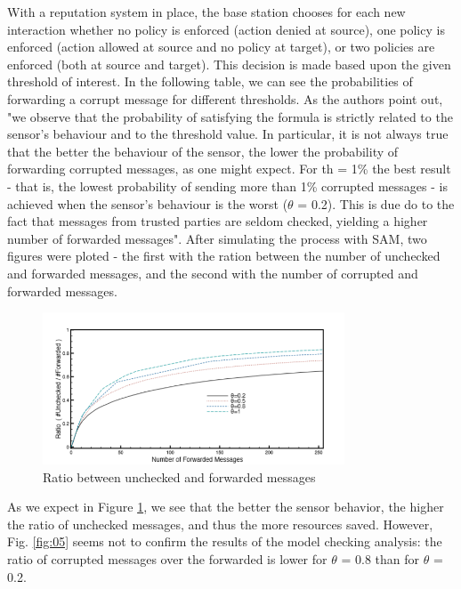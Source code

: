 \documentclass[12pt,a4paper,twoside]{report}
\begin{document}
With a reputation system in place, the base station chooses for each new interaction whether no policy is enforced (action denied at source), one policy is enforced (action allowed at source and no policy at target), or two policies are enforced (both at source and target). This decision is made based upon the given threshold of interest. In the following table, we can see the probabilities of forwarding a corrupt message for different thresholds. As the authors point out, "we observe that the probability of satisfying the formula is strictly related to the sensor's behaviour and to the threshold value. In particular, it is not always true that the better the behaviour of the sensor, the lower the probability of forwarding corrupted messages, as one might expect. For th = 1\% the best result - that is, the lowest probability of sending more than 1\% corrupted messages - is achieved when the sensor's behaviour is the worst ($\theta$ = 0.2). This is due do to the fact that messages from trusted parties are seldom checked, yielding a higher number of forwarded messages". After simulating the process with SAM, two figures were ploted - the first with the ration between the number of unchecked and forwarded messages, and the second with the number of corrupted and forwarded messages.\par

\begin{figure}[ht]
	\begin{center}
  \includegraphics[width=0.8\textwidth,natwidth=631,natheight=345]{./figures/figure-04.png}
  \end{center}
  \caption{Ratio between unchecked and forwarded messages \cite{vigo;etal:2014}}
  \label{fig:04}
\end{figure}

As we expect in Figure \ref{fig:04}, we see that the better the sensor behavior, the higher the ratio of unchecked messages, and thus the more resources saved. However, Fig. \ref{fig:05} seems not to confirm the results of the model checking analysis: the ratio of corrupted messages over the forwarded is lower for $\theta$ = 0.8 than for $\theta$ = 0.2. 
\end{document}
